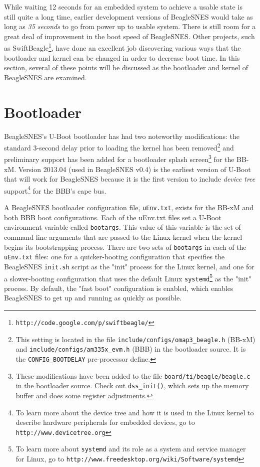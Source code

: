 While waiting 12 seconds for an embedded system to achieve a usable state is still quite a long time, earlier development versions of BeagleSNES would take as long as \emph{35 seconds} to go from power up to usable system.  There is still room for a great deal of improvement in the boot speed of BeagleSNES.  Other projects, such as SwiftBeagle\footnote{\texttt{http://code.google.com/p/swiftbeagle/}}, have done an excellent job discovering various ways that the bootloader and kernel can be changed in order to decrease boot time.  In this section, several of these points will be discussed as the bootloader and kernel of BeagleSNES are examined.

\section{Bootloader}

BeagleSNES's U-Boot bootloader has had two noteworthy modifications: the standard 3-second delay prior to loading the kernel has been removed\footnote{This setting is located in the file \texttt{include/configs/omap3\_beagle.h} (BB-xM) and \texttt{include/configs/am335x\_evm.h} (BBB) in the bootloader source.  It is the \texttt{CONFIG\_BOOTDELAY} pre-processor define.} and preliminary support has been added for a bootloader splash screen\footnote{These modifications have been added to the file \texttt{board/ti/beagle/beagle.c} in the bootloader source.  Check out \texttt{dss\_init()}, which sets up the memory buffer and does some register adjustments.} for the BB-xM.  Version 2013.04 (used in BeagleSNES v0.4) is the earliest version of U-Boot that will work for BeagleSNES because it is the first version to include \emph{device tree} support\footnote{To learn more about the device tree and how it is used in the Linux kernel to describe hardware peripherals for embedded devices, go to \texttt{http://www.devicetree.org}} for the BBB's cape bus.  

A BeagleSNES bootloader configuration file, \texttt{uEnv.txt}, exists for the BB-xM and both BBB boot configurations.  Each of the uEnv.txt files set a U-Boot environment variable called \texttt{bootargs}.  This value of this variable is the set of command line arguments that are passed to the Linux kernel when the kernel begins its bootstrapping process.  There are two sets of \texttt{bootargs} in each of the \texttt{uEnv.txt} files: one for a quicker-booting configuration that specifies the BeagleSNES \texttt{init.sh} script as the "init" process for the Linux kernel, and one for a slower-booting configuration that uses the default Linux \texttt{systemd}\footnote{To learn more about \texttt{systemd} and its role as a system and service manager for Linux, go to \texttt{http://www.freedesktop.org/wiki/Software/systemd}}  as the "init" process.  By default, the "fast boot" configuration is enabled, which enables BeagleSNES to get up and running as quickly as possible.

